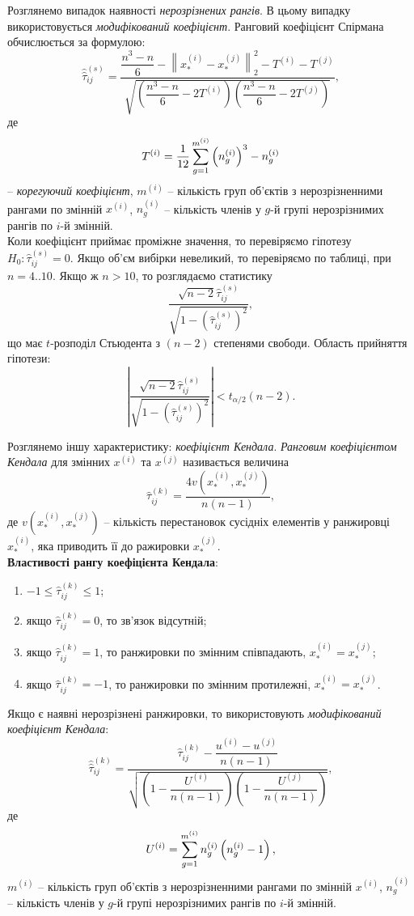 Розглянемо випадок наявності \textit{нерозрізнених рангів}. В цьому випадку використовується \textit{модифікований коефіцієнт}. Ранговий коефіцієнт Спірмана обчислюється за формулою:
\[ \widehat{\widehat{\tau}}_{ij}^{(s)} = \dfrac{\dfrac{n^3-n}{6}-\left\|x_*^{(i)}-x_*^{(j)}\right\|_2^2-T^{(i)}-T^{(j)}}{\sqrt{\left(\dfrac{n^3-n}{6}-2T^{(i)}\right)\left(\dfrac{n^3-n}{6}-2T^{(j)}\right)}}, \] де \[ T^{(i)} = \dfrac{1}{12} \displaystyle\sum\limits_{g=1}^{m^{(i)}} \left(n_g^{(i)}\right)^3 - n_g^{(i)} \] -- \textit{корегуючий коефіцієнт}, $m^{(i)}$ -- кількість груп об'єктів з нерозрізненними рангами по змінній $x^{(i)}$, $n_g^{(i)}$ -- кількість членів у $g$-й групі нерозрізнимих рангів по $i$-й змінній. \\

Коли коефіцієнт приймає проміжне значення, то перевіряємо гіпотезу $H_0: \widehat{\tau}_{ij}^{(s)} = 0$. Якщо об'єм вибірки невеликий, то перевіряємо по таблиці, при $n = 4..10$. Якщо ж $n > 10$, то розглядаємо статистику \[\dfrac{\sqrt{n-2}\widehat{\tau}_{ij}^{(s)}}{\sqrt{1-\left(\widehat{\tau}_{ij}^{(s)}\right)^2}},\] що має $t$-розподіл Стьюдента з $(n - 2)$ степенями свободи. Область прийняття гіпотези: \[\left|\dfrac{\sqrt{n-2}\widehat{\tau}_{ij}^{(s)}}{\sqrt{1-\left(\widehat{\tau}_{ij}^{(s)}\right)^2}}\right| < t_{\alpha/2}(n-2). \]

Розглянемо іншу характеристику: \textit{коефіцієнт Кендала}. \textit{Ранговим коефіцієнтом Кендала} для змінних $x^{(i)}$ та $x^{(j)}$ називається величина \[\widehat{\tau}_{ij}^{(k)} = \dfrac{4v\left(x_*^{(i)},x_*^{(j)}\right)}{n(n-1)},\] де $v\left(x_*^{(i)},x_*^{(j)}\right)$ -- кількість перестановок сусідніх елементів у ранжировці $x_*^{(i)}$, яка приводить її до ражировки $x_*^{(j)}$. \\

\textbf{Властивості рангу коефіцієнта Кендала}:
\begin{enumerate}
	\item $-1 \le \widehat{\tau}_{ij}^{(k)} \le 1$;
	\item якщо $\widehat{\tau}_{ij}^{(k)} = 0$, то зв'язок відсутній;
	\item якщо $\widehat{\tau}_{ij}^{(k)} = 1$, то ранжировки по змінним співпадають, $x_*^{(i)} =x_*^{(j)}$;
	\item якщо $\widehat{\tau}_{ij}^{(k)} = -1$, то ранжировки по змінним протилежні, $x_*^{(i)} =x_*^{(j)}$.
\end{enumerate}

Якщо є наявні нерозрізнені ранжировки, то використовують \textit{модифікований коефіцієнт Кендала}: \[ \widehat{\widehat{\tau}}_{ij}^{(k)}  = \dfrac{\widehat{\tau}_{ij}^{(k)} - \dfrac{u^{(i)}-u^{(j)}}{n(n-1)}}{\sqrt{\left(1-\dfrac{U^{(i)}}{n(n-1)}\right)\left(1-\dfrac{U^{(j)}}{n(n-1)}\right)}}, \] де \[ U^{(i)} = \displaystyle\sum\limits_{g=1}^{m^{(i)}} n_g^{(i)} \left( n_g^{(i)} -1 \right), \] $m^{(i)}$ -- кількість груп об'єктів з нерозрізненними рангами по змінній $x^{(i)}$, $n_g^{(i)}$ -- кількість членів у $g$-й групі нерозрізнимих рангів по $i$-й змінній. \\

